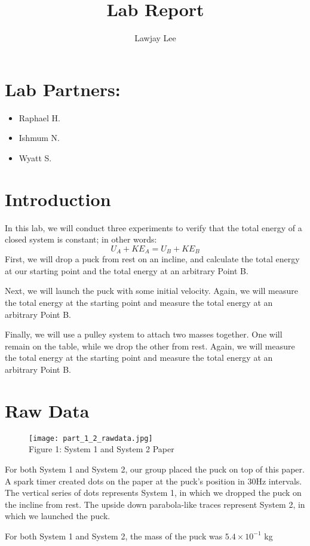 \documentclass[fleqn]{article}
\title{ Lab Report}
\author{Lawjay Lee}
\date{}
\begin{document}
\maketitle

\section*{Lab Partners:}
\begin{itemize}
	\item Raphael H.
	\item Ishmum N.
	\item Wyatt S.
\end{itemize}

\section*{Introduction}
In this lab, we will conduct three experiments to verify that the total energy of a closed system is constant; in other words:
\[ U_A+KE_A=U_B+KE_B \]
First, we will drop a puck from rest on an incline, and calculate the total energy at our starting point and the total energy at an arbitrary Point B.

Next, we will launch the puck with some initial velocity. Again, we will measure the total energy at the starting point and measure the total energy at an arbitrary Point B.

Finally, we will use a pulley system to attach two masses together. One will remain on the table, while we drop the other from rest. Again, we will measure the total energy at the starting point and measure the total energy at an arbitrary Point B.

\section*{Raw Data}
\begin{figure}[H]
	\centering
	\texttt{[image: part\_1\_2\_rawdata.jpg]}
	\\Figure 1: System 1 and System 2 Paper
\end{figure}
For both System 1 and System 2, our group placed the puck on top of this paper. A spark timer created dots on the paper at the puck's position in 30Hz intervals. The vertical series of dots represents System 1, in which we dropped the puck on the incline from rest. The upside down parabola-like traces represent System 2, in which we launched the puck.

For both System 1 and System 2, the mass of the puck was $5.4 \times 10^{-1}$ kg
\end{document}
